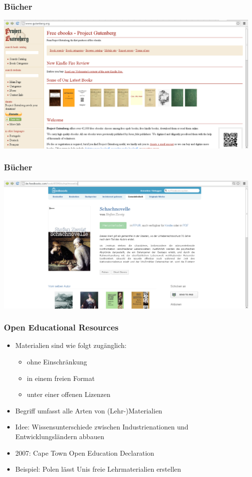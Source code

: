 \documentclass[table]{beamer}
\begin{document}
\begin{frame}
  \frametitle{Bücher}
  \includegraphics[width=\textwidth]{img/gutenberg.png}
\end{frame}

\begin{frame}
  \frametitle{Bücher}
  \includegraphics[width=\textwidth]{img/feedbooks.png}
\end{frame}

\begin{frame}
  \frametitle{Open Educational Resources}
    \begin{itemize}
        \item<2-> Materialien sind wie folgt zugänglich:
            \begin{itemize}
                \item<3-> ohne Einschränkung
                \item<4-> in einem freien Format
                \item<5-> unter einer offenen Lizenzen 
            \end{itemize}
        \item<6-> Begriff umfasst alle Arten von (Lehr-)Materialien
        \item<7-> Idee: Wissensunterschiede zwischen Industrienationen und Entwicklungsländern abbauen
        \item<8-> 2007: Cape Town Open Education Declaration
        \item<9-> Beispiel: Polen lässt Unis freie Lehrmaterialien erstellen
    \end{itemize}
\end{frame}
\end{document}
